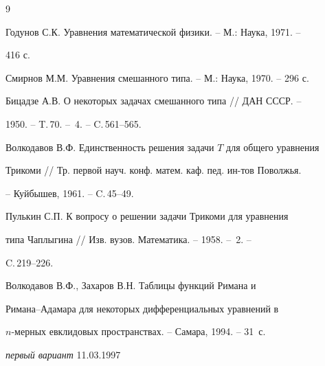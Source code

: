 \begin{thebibliography}{9} 


 




Годунов С.К. Уравнения математической физики. -- М.: Наука, 1971. -- 


416 с. 




Смирнов М.М. Уравнения смешанного типа. -- М.: Наука, 1970. -- 296 с. 




Бицадзе А.В. О некоторых задачах смешанного типа // ДАН СССР. -- 


1950. -- T.\,70. -- \No\,4. -- C.\,561--565. 




Волкодавов В.Ф. Единственность решения задачи $T$ для общего уравнения 


Трикоми // Тр. первой науч. конф. матем. каф. пед. ин-тов Поволжья. 


-- Куйбышев, 1961. -- C.\,45--49. 




Пулькин С.П. К вопросу о решении задачи Трикоми для уравнения 


типа Чаплыгина // Изв. вузов. Математика. -- 1958. -- \No\,2. -- 


C.\,219--226. 




Волкодавов В.Ф., Захаров В.Н. Таблицы функций Римана и 


Римана--Адамара для некоторых дифференциальных уравнений в 


$n$-мерных евклидовых пространствах. -- Самара, 1994. -- 31~с. 


 


\end{thebibliography} 


 


\vskip 2cm 


 




% 


{{\it первый вариант} 11.03.1997} 




 


\label{end} 


 


 


